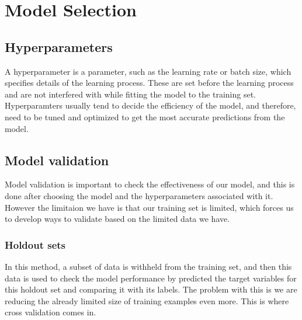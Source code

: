 \documentclass[12pt]{article}
\begin{document}
\section{Model Selection} \label{model-selection}
\subsection{Hyperparameters}
A hyperparameter is a parameter, such as the learning rate or batch size, which specifies details of the learning process. These are set before the learning process and are not interfered with while fitting the model to the training set. Hyperparamters usually tend to decide the efficiency of the model, and therefore, need to be tuned and optimized to get the most accurate predictions from the model.

\subsection{Model validation}
Model validation is important to check the effectiveness of our model, and this is done after choosing the model and the hyperparameters associated with it. However the limitaion we have is that our training set is limited, which forces us to develop ways to validate based on the limited data we have.
\subsubsection*{Holdout sets}
In this method, a subset of data is withheld from the training set, and then this data is used to check the model performance by predicted the target variables for this holdout set and comparing it with its labels. The problem with this is we are reducing the already limited size of training examples even more. This is where cross validation comes in.
\end{document}
